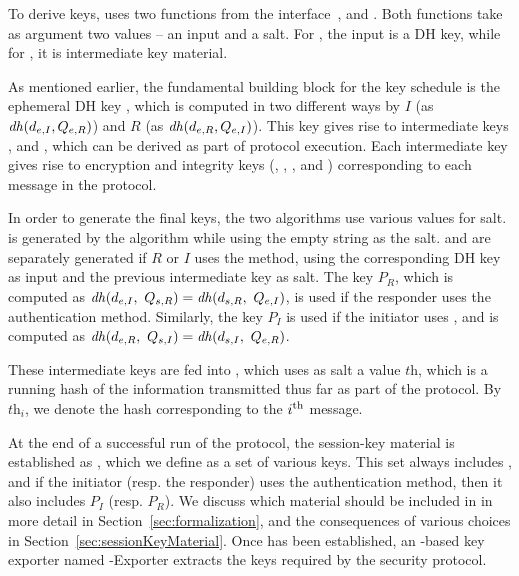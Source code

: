 \documentclass[runningheads]{llncs}
\begin{document}
To derive keys, \mEdhoc{} uses two functions from the \mHkdf{}
interface~\cite{rfc5869}, \mHkdfExtract{} and \mHkdfExpand{}.
%
Both functions take as argument two values -- an input and a salt.
%
For \mHkdfExtract{}, the input is a DH key, while for \mHkdfExpand{},
it is intermediate key material.
%

As mentioned earlier, the fundamental building block for the key schedule is
the ephemeral DH key \mGxy{}, which is computed in two different ways by
$I$ (as $\mathit{dh}(d_{e,I}, Q_{e,R})$) and $R$ (as $\mathit{dh}(d_{e,R}, Q_{e,I})$).
%
This key gives rise to intermediate keys \mPRKtwo{}, \mPRKthree{} and
\mPRKfour{}, which can be derived as part of protocol execution.
%
Each intermediate key gives rise to encryption and integrity keys
(\mKtwoe, \mKtwom{}, \mKthreeae, and \mKthreem)
corresponding to each message in the protocol.
%

In order to generate the final keys, the two \mHkdf{} algorithms use various
values for salt.
%
\mPRKtwo{} is generated by the \mHkdfExtract{} algorithm while using the
empty
string as the salt.
%
\mPRKthree{} and \mPRKfour{} are separately generated if $R$ or $I$ uses the
\mStat{} method, using the corresponding DH key as input and the previous
intermediate key as salt.
%
The key $P_{R}$, which is computed as $\mathit{dh}(d_{e,I},\ Q_{s,R}{}) = \mathit{dh}(d_{s,R},\
Q_{e,I})$, is used if the responder uses the \mStat{} authentication
method.
%
Similarly, the key $P_{I}$ is used if the initiator uses \mStat{}, and is
computed as $\mDH(\mY,\ \mGi{}) = \mDH(\mPriv{I},\ \mGy)$.
%

These intermediate keys are fed into \mHkdfExpand{}, which uses as salt a value $\textit{th}$, which is a running
hash of the information transmitted thus far as part of the protocol.
%
By $\textit{th}_{i}$, we denote the hash corresponding to the $i^{\rm{th}}$ message.
%

At the end of a successful run of the protocol, the session-key material is
established as \mSessKey{}, which we define as a set of various keys.
%
This set always includes \mGxy{}, and if the initiator (resp. the responder) uses
the \mStat{} authentication method, then it also includes $P_{I}$ (resp.
$P_{R}$).
%
We
discuss which material should be included in \mSessKey{} in more detail
in Section~\ref{sec:formalization}, and the consequences of
various choices in Section~\ref{sec:sessionKeyMaterial}.
%
Once \mSessKey{} has been established, an \mHkdf{}-based key exporter
named
\mEdhoc-Exporter extracts the keys required by the security protocol.
%
\end{document}

